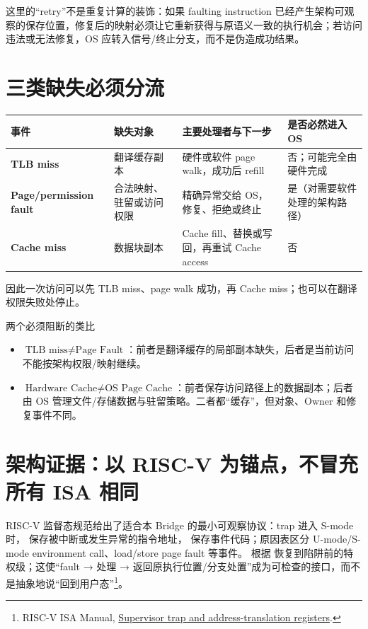 \documentclass[UTF8,fontset=none,11pt,a4paper]{ctexart}
\begin{document}
这里的“retry”不是重复计算的装饰：如果 faulting instruction 已经产生架构可观察的保存位置，修复后的映射必须让它重新获得与原语义一致的执行机会；若访问违法或无法修复，OS 应转入信号/终止分支，而不是伪造成功结果。

\section{三类缺失必须分流}
\begin{center}\small
\begin{tabularx}{\linewidth}{>{\bfseries}p{2.3cm}YYY}
\toprule
事件 & 缺失对象 & 主要处理者与下一步 & 是否必然进入 OS\\
\midrule
TLB miss & 翻译缓存副本 & 硬件或软件 page walk，成功后 refill & 否；可能完全由硬件完成\\
Page/permission fault & 合法映射、驻留或访问权限 & 精确异常交给 OS，修复、拒绝或终止 & 是（对需要软件处理的架构路径）\\
Cache miss & 数据块副本 & Cache fill、替换或写回，再重试 Cache access & 否\\
\bottomrule
\end{tabularx}\end{center}

因此一次访问可以先 TLB miss、page walk 成功，再 Cache miss；也可以在翻译权限失败处停止。

\begin{warnbox}{两个必须阻断的类比}
\begin{itemize}
\item \(\text{TLB miss}\neq\text{Page Fault}\)：前者是翻译缓存的局部副本缺失，后者是当前访问不能按架构权限/映射继续。
\item \(\text{Hardware Cache}\neq\text{OS Page Cache}\)：前者保存访问路径上的数据副本；后者由 OS 管理文件/存储数据与驻留策略。二者都“缓存”，但对象、Owner 和修复事件不同。
\end{itemize}
\end{warnbox}

\section{架构证据：以 RISC-V 为锚点，不冒充所有 ISA 相同}
RISC-V 监督态规范给出了适合本 Bridge 的最小可观察协议：trap 进入 S-mode 时， 保存被中断或发生异常的指令地址， 保存事件代码；原因表区分 U-mode/S-mode environment call、load/store page fault 等事件。 根据  恢复到陷阱前的特权级；这使“fault → 处理 → 返回原执行位置/分支处置”成为可检查的接口，而不是抽象地说“回到用户态”\footnote{RISC-V ISA Manual, \href{https://github.com/riscv/riscv-isa-manual/blob/main/src/priv/supervisor.adoc}{Supervisor trap and address-translation registers}.}。
\end{document}
